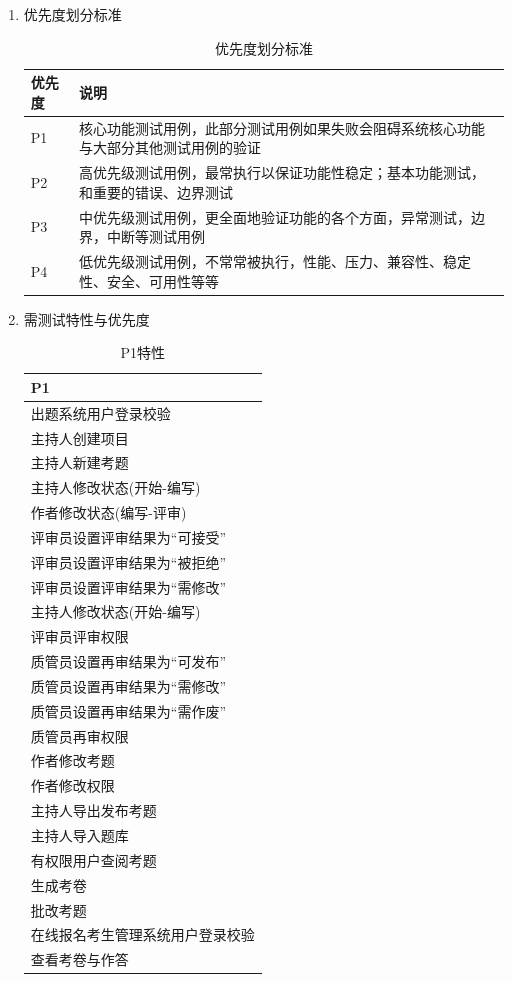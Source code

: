 \documentclass[hyperref, a4paper]{ctexart}
\providecommand{\tightlist}{%
  \setlength{\itemsep}{0pt}\setlength{\parskip}{0pt}}
\begin{document}
\begin{enumerate}
\def\labelenumi{\arabic{enumi}.}
\tightlist
\item
  优先度划分标准

  \begin{table}[h]
  \centering
  \caption{优先度划分标准}
  \begin{tabular}{|p{2cm}|p{8cm}|}
  \hline
  优先度 & 说明\\
  \hline
  P1 & 核心功能测试用例，此部分测试用例如果失败会阻碍系统核心功能与大部分其他测试用例的验证\\
  \hline
  P2 & 高优先级测试用例，最常执行以保证功能性稳定；基本功能测试，和重要的错误、边界测试\\
  \hline
  P3 & 中优先级测试用例，更全面地验证功能的各个方面，异常测试，边界，中断等测试用例\\
  \hline
  P4 & 低优先级测试用例，不常常被执行，性能、压力、兼容性、稳定性、安全、可用性等等\\
  \hline
  \end{tabular}
  \end{table}
\item
  需测试特性与优先度

  \begin{table}[h]
  \centering
  \caption{P1特性}
  \begin{tabular}{|p{10cm}|}
  \hline
  P1\\
  \hline
  出题系统用户登录校验\\
  \hline
  主持人创建项目\\
  \hline
  主持人新建考题\\
  \hline
  主持人修改状态(开始-编写)\\
  \hline
  作者修改状态(编写-评审) \\
  \hline
  评审员设置评审结果为“可接受” \\
  \hline
  评审员设置评审结果为“被拒绝”\\
  \hline
  评审员设置评审结果为“需修改” \\
  \hline
  主持人修改状态(开始-编写)\\
  \hline
  评审员评审权限\\
  \hline
  质管员设置再审结果为“可发布” \\
  \hline
  质管员设置再审结果为“需修改” \\
  \hline
  质管员设置再审结果为“需作废”\\
  \hline
  质管员再审权限\\
  \hline
  作者修改考题\\
  \hline
  作者修改权限\\
  \hline
  主持人导出发布考题\\
  \hline
  主持人导入题库\\
  \hline
  有权限用户查阅考题\\
  \hline
  生成考卷\\
  \hline
  批改考题\\
  \hline
  在线报名考生管理系统用户登录校验\\
  \hline
  查看考卷与作答\\
  \hline
  \end{tabular}
  \end{table}
\end{enumerate}
\end{document}
